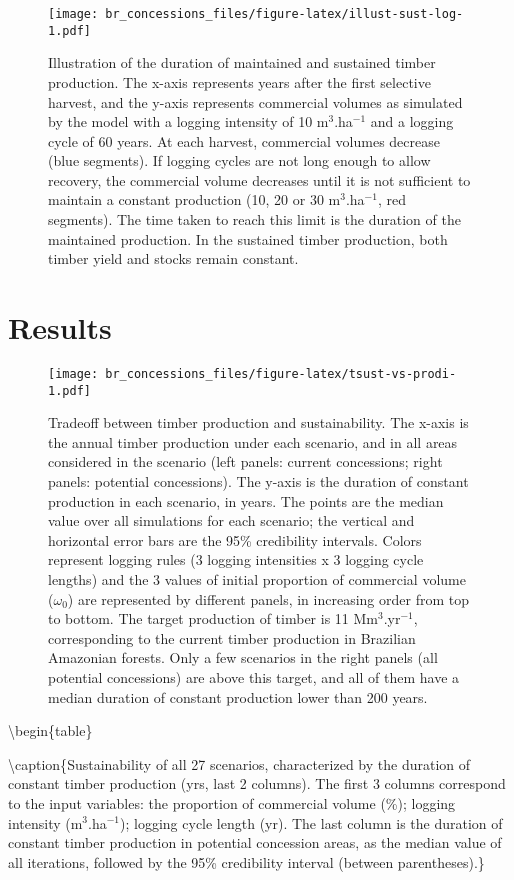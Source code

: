 \documentclass[
]{article}
\begin{document}
\begin{figure}
\centering
\texttt{[image: br\_concessions\_files/figure-latex/illust-sust-log-1.pdf]}
\caption{\label{fig:illust-sust-log}Illustration of the duration of maintained and sustained timber production. The x-axis represents years after the first selective harvest, and the y-axis represents commercial volumes as simulated by the model with a logging intensity of 10 m\(^3\).ha\(^{-1}\) and a logging cycle of 60 years. At each harvest, commercial volumes decrease (blue segments). If logging cycles are not long enough to allow recovery, the commercial volume decreases until it is not sufficient to maintain a constant production (10, 20 or 30 m\(^3\).ha\(^{-1}\), red segments). The time taken to reach this limit is the duration of the maintained production. In the sustained timber production, both timber yield and stocks remain constant.}
\end{figure}

\hypertarget{results}{%
\section{Results}\label{results}}

\begin{figure}
\centering
\texttt{[image: br\_concessions\_files/figure-latex/tsust-vs-prodi-1.pdf]}
\caption{\label{fig:tsust-vs-prodi}Tradeoff between timber production and sustainability. The x-axis is the annual timber production under each scenario, and in all areas considered in the scenario (left panels: current concessions; right panels: potential concessions). The y-axis is the duration of constant production in each scenario, in years. The points are the median value over all simulations for each scenario; the vertical and horizontal error bars are the 95\% credibility intervals. Colors represent logging rules (3 logging intensities x 3 logging cycle lengths) and the 3 values of initial proportion of commercial volume (\(\omega_0\)) are represented by different panels, in increasing order from top to bottom. The target production of timber is 11 Mm\(^3\).yr\(^{-1}\), corresponding to the current timber production in Brazilian Amazonian forests. Only a few scenarios in the right panels (all potential concessions) are above this target, and all of them have a median duration of constant production lower than 200 years.}
\end{figure}

\textbackslash begin\{table\}

\textbackslash caption\{\label{tab:sust-production}Sustainability of all 27 scenarios, characterized by the duration of constant timber production (yrs, last 2 columns). The first 3 columns correspond to the input variables: the proportion of commercial volume (\%); logging intensity (m\(^3\).ha\(^{-1}\)); logging cycle length (yr). The last column is the duration of constant timber production in potential concession areas, as the median value of all iterations, followed by the 95\% credibility interval (between parentheses).\}
\centering
\end{document}
